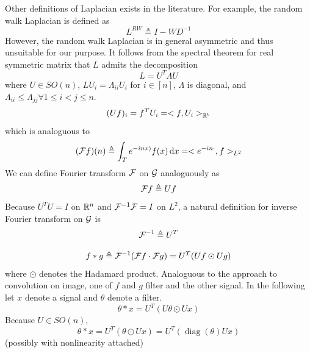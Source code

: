\documentclass{article}
\DeclareMathOperator{\diag}{diag}
\begin{document}
Other definitions of Laplacian exists in the literature.
For example, the random walk Laplacian is defined as
\[
L^{RW} \triangleq I - W D^{-1}
\]
However, the random walk Laplacian is in general asymmetric and thus unsuitable for our purpose.
It follows from the spectral theorem for real symmetric matrix that $L$ admits the decomposition
\begin{equation*}
L = U^T \Lambda U
\end{equation*}
where $U \in SO(n)$, $L U_i = \Lambda_{i i} U_i$ for $i \in [n]$, $\Lambda$ is diagonal, and $\Lambda_{i i} \leq \Lambda_{j j} \forall 1 \leq i < j \leq n$.
\begin{equation*}
(U f)_i
= f^T U_i
= <f, U_i>_{{\mathbb R}^b}
\end{equation*}
which is analoguous to
\begin{equation*}
(\calf f) (n)
\triangleq \int_T e^{-i n x)} f(x) \dif x
= <e^{-i n \cdot}, f>_{L^2}
\end{equation*}
We can define Fourier transform ${\mathcal F}$ on ${\mathcal G}$ analoguously as
\begin{equation*}
{\mathcal F} f \triangleq U f
\end{equation*}
Because $U^T U = I$ on ${\mathbb R}^n$ and ${\mathcal F}^{-1} {\mathcal F} = I$ on $L^2$, a natural definition for inverse Fourier transform on ${\mathcal G}$ is
\begin{equation*}
{\mathcal F}^{-1} \triangleq U^T
\end{equation*}

\begin{equation*}
f * g
\triangleq {\mathcal F}^{-1} ({\mathcal F} f \cdot {\mathcal F} g)
= U^T (U f \odot U g)
\end{equation*}
where $\odot$ denotes the Hadamard product.
Analoguous to the approach to convolution on image, one of $f$ and $g$ filter and the other signal.
In the following let $x$ denote a signal and $\theta$ denote a filter.
\[
\theta * x
= U^T (U \theta \odot U x)
\]
Because $U \in SO(n)$,
\[
\theta * x
= U^T (\theta \odot U x)
= U^T (\diag (\theta) U x)
\]
(possibly with nonlinearity attached)
\end{document}

